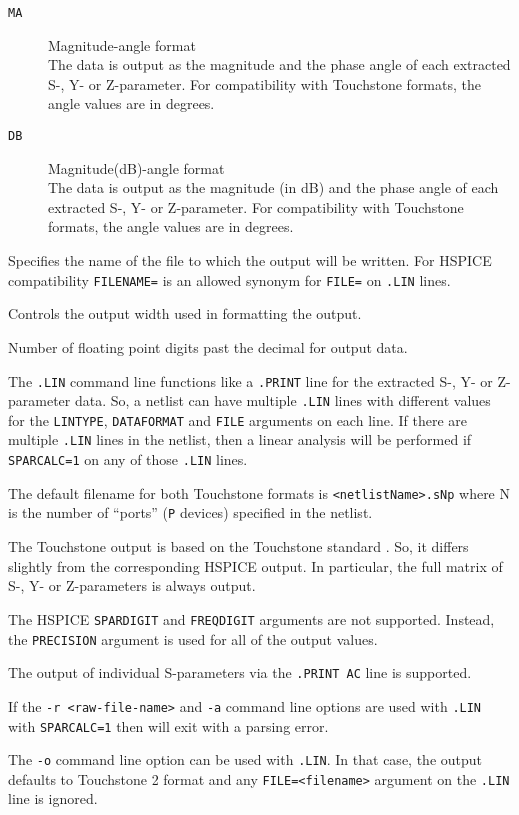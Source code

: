 \begin{Command}
\begin{Arguments}
\begin{description}
\item[\tt MA] Magnitude-angle format \\
The data is output as the magnitude and the phase angle of each
extracted S-, Y- or Z-parameter.  For compatibility with Touchstone formats,
the angle values are in degrees.

\item[\tt DB] Magnitude(dB)-angle format \\
The data is output as the magnitude (in dB) and the phase angle of
each extracted S-, Y- or Z-parameter.  For compatibility with Touchstone
formats, the angle values are in degrees.
\end{description}

Specifies the name of the file to which the output will be written.
For HSPICE compatibility \texttt{FILENAME=} is an allowed synonym
for \texttt{FILE=} on \texttt{.LIN} lines.


Controls the output width used in formatting the output.


Number of floating point digits past the decimal for output data.

\end{Arguments}


\comments

The \texttt{.LIN} command line functions like a \texttt{.PRINT} line for
the extracted S-, Y- or Z-parameter data.  So, a netlist can have multiple
\texttt{.LIN} lines with different values for the \texttt{LINTYPE},
\texttt{DATAFORMAT} and \texttt{FILE} arguments on each line.  If there are
multiple \texttt{.LIN} lines in the netlist, then a linear analysis will
be performed if \texttt{SPARCALC=1} on any of those \texttt{.LIN} lines.

The default filename for both Touchstone formats is \texttt{<netlistName>.sNp}
where N is the number of ``ports'' (\texttt{P} devices) specified in the netlist.

The \Xyce{} Touchstone output is based on the Touchstone standard
\cite{touchstone2_std_2009}. So, it differs slightly from the
corresponding HSPICE output.  In particular, the full matrix of
S-, Y- or Z-parameters is always output.

The HSPICE \texttt{SPARDIGIT} and \texttt{FREQDIGIT} arguments are
not supported.  Instead, the \texttt{PRECISION} argument is used for
all of the output values.

The output of individual S-parameters via the \texttt{.PRINT AC} line is
supported.

If the \texttt{-r <raw-file-name>} and \texttt{-a} command line options
are used with \texttt{.LIN} with \texttt{SPARCALC=1} then \Xyce{} will
exit with a parsing error.

The \texttt{-o} command line option can be used with \texttt{.LIN}.
In that case, the output defaults to Touchstone 2 format and any
\texttt{FILE=<filename>} argument on the \texttt{.LIN} line is
ignored.

\end{Command}

